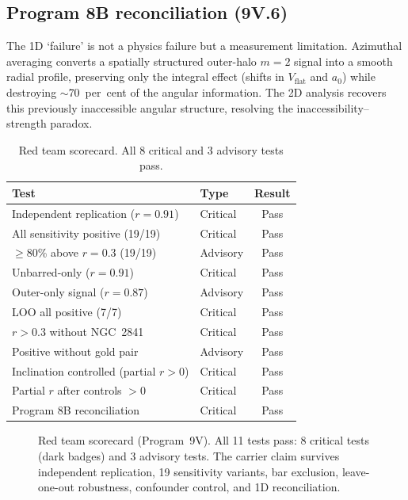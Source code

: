 \documentclass[fleqn,usenatbib]{mnras}
\newcommand{\vflat}{V_\mathrm{flat}}
\newcommand{\azero}{a_0}
\newcommand{\mtwo}{m{=}2}
\begin{document}
\subsection{Program 8B reconciliation (9V.6)}

The 1D `failure' is not a physics failure but a measurement limitation.
Azimuthal averaging converts a spatially structured outer-halo $\mtwo$ signal into a smooth radial profile, preserving only the integral effect (shifts in $\vflat$ and $\azero$) while destroying $\sim$70~per~cent of the angular information.
The 2D analysis recovers this previously inaccessible angular structure, resolving the inaccessibility--strength paradox.

\begin{table}
\centering
\caption{Red team scorecard. All 8 critical and 3 advisory tests pass.}
\label{tab:redteam}
\begin{tabular}{llc}
\toprule
Test & Type & Result \\
\midrule
Independent replication ($r = 0.91$) & Critical & Pass \\
All sensitivity positive (19/19) & Critical & Pass \\
$\geq$80\% above $r = 0.3$ (19/19) & Advisory & Pass \\
Unbarred-only ($r = 0.91$) & Critical & Pass \\
Outer-only signal ($r = 0.87$) & Advisory & Pass \\
LOO all positive (7/7) & Critical & Pass \\
$r > 0.3$ without NGC~2841 & Critical & Pass \\
Positive without gold pair & Advisory & Pass \\
Inclination controlled (partial $r > 0$) & Critical & Pass \\
Partial $r$ after controls $> 0$ & Critical & Pass \\
Program 8B reconciliation & Critical & Pass \\
\bottomrule
\end{tabular}
\end{table}

\begin{figure}
\centering

\caption{Red team scorecard (Program~9V). All 11 tests pass: 8 critical tests (dark badges) and 3 advisory tests. The carrier claim survives independent replication, 19 sensitivity variants, bar exclusion, leave-one-out robustness, confounder control, and 1D reconciliation.}
\label{fig:redteam}
\end{figure}
\end{document}
